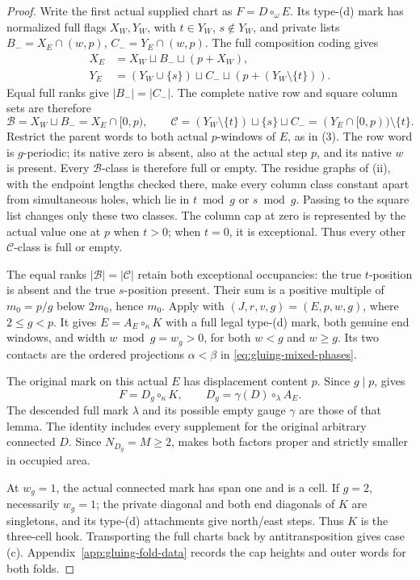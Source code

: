 \documentclass[11pt,a4paper]{amsart}
\numberwithin{equation}{section}
\theoremstyle{plain}
\theoremstyle{definition}
\begin{document}
\begin{proof}
Write the first actual supplied chart as \(F=D\circ_\omega E\).
Its type-(d) mark has normalized full flags \(X_W,Y_W\), with
\(t\in Y_W\), \(s\notin Y_W\), and private lists
\(B_-=X_E\cap(w,p)\), \(C_-=Y_E\cap(w,p)\).
The full composition coding gives
\[
 \begin{aligned}
 X_E&=X_W\sqcup B_-\sqcup(p+X_W),\\
 Y_E&=(Y_W\cup\{s\})\sqcup C_-\sqcup(p+(Y_W\setminus\{t\})).
 \end{aligned}
\]
Equal full ranks give \(|B_-|=|C_-|\).  The complete native
row and square column sets are therefore
\[
 \mathcal B=X_W\sqcup B_-=X_E\cap[0,p),\qquad
 \mathcal C=(Y_W\setminus\{t\})\sqcup\{s\}\sqcup C_-
            =(Y_E\cap[0,p))\setminus\{t\}.
\]
Restrict the parent words to both actual \(p\)-windows of \(E\),
as in (3).  The row word is \(g\)-periodic;
its native zero is absent, also at the actual step \(p\), and
its native \(w\) is present.  Every \(\mathcal B\)-class is
therefore full or empty.  The residue graphs of
(ii), with the endpoint lengths checked
there, make every column class constant apart from simultaneous
holes, which lie in \(t\bmod g\) or \(s\bmod g\).
Passing to the square list changes only these two classes.
The column cap at zero is represented by the actual value one
at \(p\) when \(t>0\); when \(t=0\), it is exceptional.
Thus every other \(\mathcal C\)-class is full or empty.

The equal ranks \(|\mathcal B|=|\mathcal C|\) retain both
exceptional occupancies: the true \(t\)-position is absent and
the true \(s\)-position present.  Their sum is a positive multiple
of \(m_0=p/g\) below \(2m_0\), hence \(m_0\).
Apply  with
\((J,r,v,g)=(E,p,w,g)\), where \(2\le g<p\).
It gives \(E=A_E\circ_\kappa K\) with a full legal type-(d) mark,
both genuine end windows, and width \(w\bmod g=w_g>0\), for
both \(w<g\) and \(w\ge g\).  Its two contacts are the ordered
projections \(\alpha<\beta\) in \eqref{eq:gluing-mixed-phases}.

The original mark on this actual \(E\) has displacement content
\(p\).  Since \(g\mid p\),  gives
\[
 F=D_g\circ_\kappa K,\qquad
 D_g=\gamma(D)\circ_\lambda A_E.
\]
The descended full mark \(\lambda\) and its possible empty
gauge \(\gamma\) are those of that lemma.  The identity includes
every supplement for the original arbitrary connected \(D\).
Since \(N_{D_g}=M\ge2\),  makes both factors
proper and strictly smaller in occupied area.

At \(w_g=1\), the actual connected mark has span one and is a
cell.  If \(g=2\), necessarily \(w_g=1\); the private diagonal
and both end diagonals of \(K\) are singletons, and its type-(d)
attachments give north/east steps.  Thus \(K\) is the three-cell
hook.  Transporting the full charts back by antitransposition
gives case (c).  Appendix~\ref{app:gluing-fold-data} records the
cap heights and outer words for both folds.
\end{proof}
\end{document}
